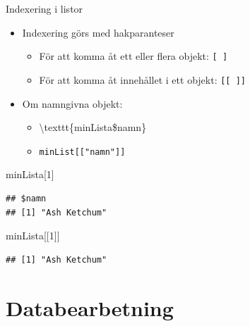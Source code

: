 \documentclass[
  11pt,
  ignorenonframetext,
]{beamer}
\newenvironment{Shaded}{\begin{snugshade}}{\end{snugshade}}
\newcommand{\DecValTok}[1]{\textcolor[rgb]{0.00,0.00,0.81}{#1}}
\newcommand{\NormalTok}[1]{#1}
\providecommand{\tightlist}{%
  \setlength{\itemsep}{0pt}\setlength{\parskip}{0pt}}
\begin{document}
\begin{frame}[fragile]{Indexering i listor}
\protect\hypertarget{indexering-i-listor}{}
\begin{itemize}
\tightlist
\item
  Indexering görs med hakparanteser

  \begin{itemize}
  \tightlist
  \item
    För att komma åt ett eller flera objekt: \texttt{[ ]}
  \item
    För att komma åt innehållet i ett objekt: \texttt{[[ ]]}
  \end{itemize}
\item
  Om namngivna objekt:

  \begin{itemize}
  \tightlist
  \item
    \textbackslash texttt\{minLista\$namn\}
  \item
    \texttt{minList[["namn"]]}
  \end{itemize}
\end{itemize}

\begin{Shaded}
\begin{Highlighting}[]
\NormalTok{minLista[}\DecValTok{1}\NormalTok{]}
\end{Highlighting}
\end{Shaded}

\begin{verbatim}
## $namn
## [1] "Ash Ketchum"
\end{verbatim}

\begin{Shaded}
\begin{Highlighting}[]
\NormalTok{minLista[[}\DecValTok{1}\NormalTok{]]}
\end{Highlighting}
\end{Shaded}

\begin{verbatim}
## [1] "Ash Ketchum"
\end{verbatim}
\end{frame}

\hypertarget{databearbetning}{%
\section{Databearbetning}\label{databearbetning}}
\end{document}
